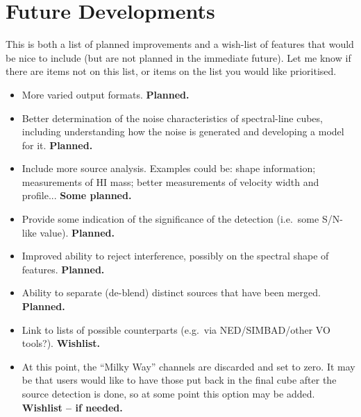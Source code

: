 \documentclass[12pt,a4paper]{article}
\newcommand{\eg}{e.g.\ }
\newcommand{\ie}{i.e.\ }
\begin{document}
\section{Future Developments}

This is both a list of planned improvements and a wish-list of
features that would be nice to include (but are not planned in the
immediate future). Let me know if there are items not on this list, or
items on the list you would like prioritised.

\begin{itemize}

\item More varied output formats. {\bf Planned.}

\item Better determination of the noise characteristics of
  spectral-line cubes, including understanding how the noise is
  generated and developing a model for it. {\bf Planned.}
  
\item Include more source analysis. Examples could be: shape
  information; measurements of HI mass; better measurements of
  velocity width and profile... {\bf Some planned.}

\item Provide some indication of the significance of the detection
  (\ie some S/N-like value). {\bf Planned.}

\item Improved ability to reject interference, possibly on the
  spectral shape of features. {\bf Planned.}

\item Ability to separate (de-blend) distinct sources that have been
  merged. {\bf Planned.}

\item Link to lists of possible counterparts (\eg via NED/SIMBAD/other
  VO tools?). {\bf Wishlist.} 

\item At this point, the ``Milky Way'' channels are discarded and set
  to zero. It may be that users would like to have those put back in
  the final cube after the source detection is done, so at some point
  this option may be added. {\bf Wishlist -- if needed.}

\end{itemize}
\end{document}
